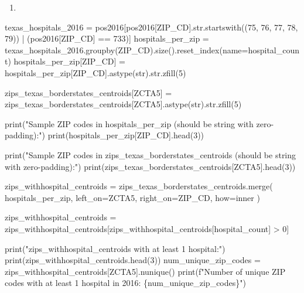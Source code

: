 \documentclass[
  letterpaper,
  DIV=11,
  numbers=noendperiod]{scrartcl}
\newenvironment{Shaded}{\begin{snugshade}}{\end{snugshade}}
\newcommand{\NormalTok}[1]{\textcolor[rgb]{0.00,0.23,0.31}{#1}}
\providecommand{\tightlist}{%
  \setlength{\itemsep}{0pt}\setlength{\parskip}{0pt}}\usepackage{longtable,booktabs,array}
\begin{document}
\begin{enumerate}
\def\labelenumi{\arabic{enumi}.}
\setcounter{enumi}{2}
\tightlist
\item
\end{enumerate}

\begin{Shaded}
\begin{Highlighting}[]
\NormalTok{texas\_hospitals\_2016 = pos2016[pos2016[\textquotesingle{}ZIP\_CD\textquotesingle{}].str.startswith((\textquotesingle{}75\textquotesingle{}, \textquotesingle{}76\textquotesingle{}, \textquotesingle{}77\textquotesingle{}, \textquotesingle{}78\textquotesingle{}, \textquotesingle{}79\textquotesingle{})) | (pos2016[\textquotesingle{}ZIP\_CD\textquotesingle{}] == \textquotesingle{}733\textquotesingle{})]}
\NormalTok{hospitals\_per\_zip = texas\_hospitals\_2016.groupby(\textquotesingle{}ZIP\_CD\textquotesingle{}).size().reset\_index(name=\textquotesingle{}hospital\_count\textquotesingle{})}
\NormalTok{hospitals\_per\_zip[\textquotesingle{}ZIP\_CD\textquotesingle{}] = hospitals\_per\_zip[\textquotesingle{}ZIP\_CD\textquotesingle{}].astype(str).str.zfill(5)}

\NormalTok{zips\_texas\_borderstates\_centroids[\textquotesingle{}ZCTA5\textquotesingle{}] = zips\_texas\_borderstates\_centroids[\textquotesingle{}ZCTA5\textquotesingle{}].astype(str).str.zfill(5)}

\NormalTok{print("Sample ZIP codes in hospitals\_per\_zip (should be string with zero{-}padding):")}
\NormalTok{print(hospitals\_per\_zip[\textquotesingle{}ZIP\_CD\textquotesingle{}].head(3))}

\NormalTok{print("Sample ZIP codes in zips\_texas\_borderstates\_centroids (should be string with zero{-}padding):")}
\NormalTok{print(zips\_texas\_borderstates\_centroids[\textquotesingle{}ZCTA5\textquotesingle{}].head(3))}

\NormalTok{zips\_withhospital\_centroids = zips\_texas\_borderstates\_centroids.merge(}
\NormalTok{    hospitals\_per\_zip,}
\NormalTok{    left\_on=\textquotesingle{}ZCTA5\textquotesingle{},}
\NormalTok{    right\_on=\textquotesingle{}ZIP\_CD\textquotesingle{},}
\NormalTok{    how=\textquotesingle{}inner\textquotesingle{}}
\NormalTok{)}

\NormalTok{zips\_withhospital\_centroids = zips\_withhospital\_centroids[zips\_withhospital\_centroids[\textquotesingle{}hospital\_count\textquotesingle{}] \textgreater{} 0]}

\NormalTok{print("zips\_withhospital\_centroids with at least 1 hospital:")}
\NormalTok{print(zips\_withhospital\_centroids.head(3))}
\NormalTok{num\_unique\_zip\_codes = zips\_withhospital\_centroids[\textquotesingle{}ZCTA5\textquotesingle{}].nunique()}
\NormalTok{print(f"Number of unique ZIP codes with at least 1 hospital in 2016: \{num\_unique\_zip\_codes\}")}
\end{Highlighting}
\end{Shaded}
\end{document}
